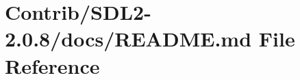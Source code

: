 \hypertarget{_contrib_2_s_d_l2-2_80_88_2docs_2_r_e_a_d_m_e_8md}{}\section{Contrib/\+S\+D\+L2-\/2.0.8/docs/\+R\+E\+A\+D\+ME.md File Reference}
\label{_contrib_2_s_d_l2-2_80_88_2docs_2_r_e_a_d_m_e_8md}
